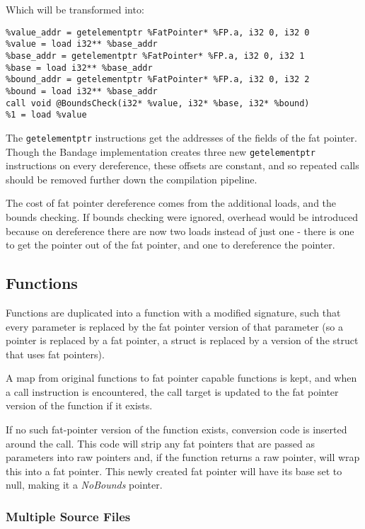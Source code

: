 Which will be transformed into:

\begin{verbatim}
%value_addr = getelementptr %FatPointer* %FP.a, i32 0, i32 0
%value = load i32** %base_addr
%base_addr = getelementptr %FatPointer* %FP.a, i32 0, i32 1
%base = load i32** %base_addr
%bound_addr = getelementptr %FatPointer* %FP.a, i32 0, i32 2
%bound = load i32** %base_addr
call void @BoundsCheck(i32* %value, i32* %base, i32* %bound)
%1 = load %value
\end{verbatim}

The \verb!getelementptr! instructions get the addresses of the fields of the fat pointer.
Though the Bandage implementation creates three new \verb!getelementptr! instructions on every dereference, these offsets are constant, and so repeated calls should be removed further down the compilation pipeline.

The cost of fat pointer dereference comes from the additional loads, and the bounds checking.
If bounds checking were ignored, overhead would be introduced because on dereference there are now two loads instead of just one - there is one to get the pointer out of the fat pointer, and one to dereference the pointer.

\subsection{Functions}

Functions are duplicated into a function with a modified signature, such that every parameter is replaced by the fat pointer version of that parameter (so a pointer is replaced by a fat pointer, a struct is replaced by a version of the struct that uses fat pointers).

A map from original functions to fat pointer capable functions is kept, and when a call instruction is encountered, the call target is updated to the fat pointer version of the function if it exists.

If no such fat-pointer version of the function exists, conversion code is inserted around the call.
This code will strip any fat pointers that are passed as parameters into raw pointers and, if the function returns a raw pointer, will wrap this into a fat pointer.
This newly created fat pointer will have its base set to null, making it a \textit{NoBounds} pointer.

\subsubsection{Multiple Source Files}

